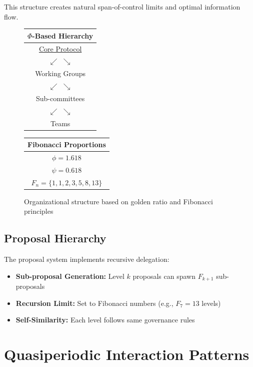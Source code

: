\documentclass[AMA]{WileyNJD-AMA}
\begin{document}
This structure creates natural span-of-control limits and optimal information flow.

\begin{figure}[h]
\centering
\begin{minipage}{0.45\textwidth}
\centering
\begin{tabular}{c}
$\Phi$-Based Hierarchy \\
\hline
\underline{Core Protocol} \\
$\swarrow$ \quad $\searrow$ \\
Working Groups \\
$\swarrow$ \quad $\searrow$ \\
Sub-committees \\
$\swarrow$ \quad $\searrow$ \\
Teams \\
\end{tabular}
\end{minipage}
\begin{minipage}{0.45\textwidth}
\centering
\begin{tabular}{c}
Fibonacci Proportions \\
\hline
$\phi = 1.618$ \\
$\psi = 0.618$ \\
$F_n = \{1,1,2,3,5,8,13\}$ \\
\hline
\end{tabular}
\end{minipage}
\caption{Organizational structure based on golden ratio and Fibonacci principles}
\label{fig:org_structure}
\end{figure}

\subsection{Proposal Hierarchy}

The proposal system implements recursive delegation:

\begin{itemize}
    \item \textbf{Sub-proposal Generation:} Level $k$ proposals can spawn $F_{k+1}$ sub-proposals
    \item \textbf{Recursion Limit:} Set to Fibonacci numbers (e.g., $F_7 = 13$ levels)
    \item \textbf{Self-Similarity:} Each level follows same governance rules
\end{itemize}

\section{Quasiperiodic Interaction Patterns}
\end{document}
